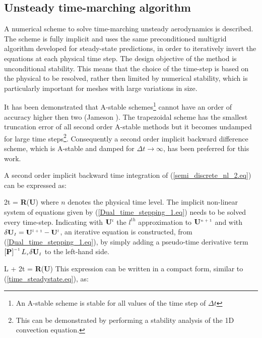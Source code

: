 \subsection{Unsteady time-marching algorithm}
%
 A numerical scheme to solve time-marching unsteady aerodynamics is described.
 The scheme is fully implicit and uses the same preconditioned multigrid algorithm
 developed for steady-state predictions, in order to iteratively invert
 the equations at each physical time step.
 The design objective of the method is unconditional stability. This means that the
 choice of the time-step is based on the physical to be resolved, rather then
 limited by numerical stability, which is particularly important for meshes
 with large variations in size.

 It has been demonstrated that A-stable schemes\footnote{An A-stable scheme is
 stable for all values of the time step of $\Delta t$}
 cannot have an order of accuracy higher then two (Jameson ).
 The trapezoidal scheme has the smallest truncation error of all second order
 A-stable methods but it becomes undamped for large
 time steps\footnote{This can be demonstrated by performing a stability analysis
 of the 1D convection equation.}.
 Consequently a second order implicit backward difference scheme, which is A-stable
 and damped for $\Delta t \rightarrow \infty$, has been preferred for this work.
 
 A second order implicit backward time integration of (\ref{semi_discrete_nl_2.eq})
 can be expressed as:

%
\beq
       {2\Delta t}
  = {\bf R}\left({\bf U}\right)
 \label{Dual_time_stepping_1.eq}
\eeq
%
 where $n$ denotes the physical time level.
 The implicit non-linear system of equations given by
 (\ref{Dual_time_stepping_1.eq}) needs to be solved
 every time-step. 
 Indicating with ${\bf U}^{\mbox{\tiny $l$}}$ the $l^{th}$ approximation to ${\bf U}^{\mbox{\tiny $n+1$}}$ and
 with $\delta {\bf U}_{\mbox{\tiny $I$}} = {\bf U}^{\mbox{\tiny $l+1$}} - {\bf U}^{\mbox{\tiny $l$}}$,
 an iterative equation is constructed, from (\ref{Dual_time_stepping_1.eq}),
 by simply adding a pseudo-time derivative term
 $\left[{\bf P}\right]^{\mbox{\tiny $-1$}} L_{\mbox{\tiny $\tau$}} \delta {\bf U}_{\mbox{\tiny $I$}}$
 to the left-hand side. 
 
%
\beq
 \left[{\bf P}\right] L\sm{\tau} +
     {2\Delta t} =  {\bf R}\left({\bf U}\right)
\label{Dual_time_stepping_2.eq}
\eeq
%
 This expression can be written in a compact form,
 similar to (\ref{time_steadystate.eq}), as:

